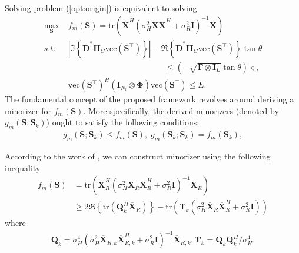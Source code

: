 \documentclass[lettersize,journal]{IEEEtran}
\begin{document}
Solving problem (\ref{opt:origin}) is equivalent to solving
\begin{equation}
\label{opt:origin}
\begin{aligned}
    \underset{\mathbf{S}}{\max} &\;
    f_m(\mathbf{S})=\text{tr}(\overline{\mathbf{X}}^H(\sigma_H^2\overline{\mathbf{X}}\overline{\mathbf{X}}^H + \sigma_R^2\mathbf{I})^{-1}\overline{\mathbf{X}}) \\
    s.t. &\;
    \left| \Im\left\{\overline{\mathbf{D}}^{*}\overline{\mathbf{H}}_C\text{vec}(\mathbf{S}^{\top})\right\} \right| - \Re\left\{\overline{\mathbf{D}}^{*}\overline{\mathbf{H}}_C\text{vec}(\mathbf{S}^{\top})\right\}\tan\theta \\
    &\qquad\qquad\qquad\qquad\qquad\qquad
    \leq (-\sqrt{\mathbf{\Gamma}\otimes\mathbf{I}_L}\tan\theta)\bm{\varsigma}, \\
    &\; \text{vec}(\mathbf{S}^{\top})^H(\mathbf{I}_{N_t}\otimes\mathbf{\Phi})\text{vec}(\mathbf{S}^{\top})\leq E.
\end{aligned}
\end{equation}
The fundamental concept of the proposed framework revolves around deriving a minorizer for $f_m(\mathbf{S})$. More specifically, the derived minorizers (denoted by $g_m(\mathbf{S}; \mathbf{S}_k)$) ought to satisfy the following conditions:
\begin{equation}
\begin{aligned}
    g_m(\mathbf{S}; \mathbf{S}_k)\leq f_m(\mathbf{S}), \;
    g_m(\mathbf{S}_k; \mathbf{S}_k)=f_m(\mathbf{S}_k),
\end{aligned}
\end{equation}

According to the work of \cite{tang2021constrained}, we can construct minorizer using the following inequality 
\begin{equation}
\begin{aligned}
    f_m(\mathbf{S})&=\text{tr}\left(\overline{\mathbf{X}}_R^{H}\left(\sigma_H^2\overline{\mathbf{X}}_R\overline{\mathbf{X}}_R^{H} + \sigma_R^2\mathbf{I}\right)^{-1}\overline{\mathbf{X}}_R\right) \\ &\geq
    2\Re\left\{\text{tr}(\mathbf{Q}_k^H\overline{\mathbf{X}}_R)\right\} - \text{tr}(\mathbf{T}_k(\sigma_H^2\overline{\mathbf{X}}_R\overline{\mathbf{X}}_R^H+\sigma_R^2\mathbf{I})) 
\end{aligned}
\end{equation}
where 
\begin{equation}
\begin{aligned}
    \mathbf{Q}_k=\sigma_H^4(\sigma_H^2\overline{\mathbf{X}}_{R,k}\overline{\mathbf{X}}_{R,k}^H+\sigma_R^2\mathbf{I})^{-1}\overline{\mathbf{X}}_{R,k}, 
    \mathbf{T}_k=\mathbf{Q}_k\mathbf{Q}_k^H/\sigma_H^4. 
\end{aligned}
\end{equation}
\end{document}
